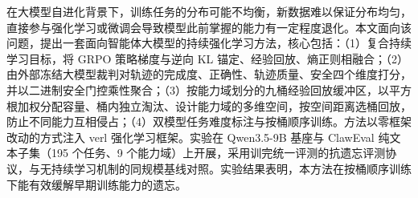 \begin{abstractzh}
在大模型自进化背景下，训练任务的分布可能不均衡，新数据难以保证分布均匀，直接参与强化学习或微调会导致模型此前掌握的能力有一定程度退化。本文面向该问题，提出一套面向智能体大模型的持续强化学习方法，核心包括：（1）复合持续学习目标，将 GRPO 策略梯度与逆向 KL 锚定、经验回放、熵正则相融合；（2）由外部冻结大模型裁判对轨迹的完成度、正确性、轨迹质量、安全四个维度打分，并以二进制安全门控乘性聚合；（3）按能力域划分的九桶经验回放缓冲区，以平方根加权分配容量、桶内独立淘汰、设计能力域的多维空间，按空间距离选桶回放，防止不同能力互相侵占；（4）双模型任务难度标注与按桶顺序训练。方法以零框架改动的方式注入 verl 强化学习框架。实验在 Qwen3.5-9B 基座与 ClawEval 纯文本子集（195 个任务、9 个能力域）上开展，采用训完统一评测的抗遗忘评测协议，与无持续学习机制的同规模基线对照。实验结果表明，本方法在按桶顺序训练下能有效缓解早期训练能力的遗忘。
\end{abstractzh}